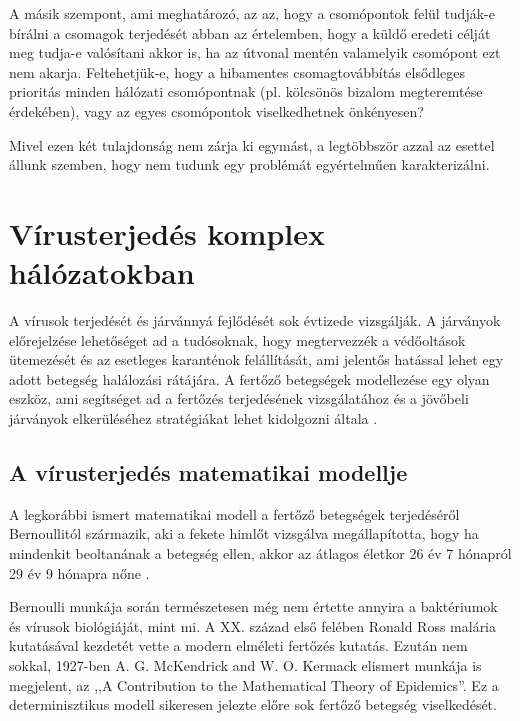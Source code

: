 A másik szempont, ami meghatározó, az az, hogy a csomópontok felül tudják-e bírálni a csomagok terjedését abban az értelemben, hogy a küldő eredeti célját meg tudja-e valósítani akkor is, ha az útvonal mentén valamelyik csomópont ezt nem akarja. Feltehetjük-e, hogy a hibamentes csomagtovábbítás elsődleges prioritás minden hálózati csomópontnak (pl. kölcsönös bizalom megteremtése érdekében), vagy az egyes csomópontok viselkedhetnek önkényesen?

Mivel ezen két tulajdonság nem zárja ki egymást, a legtöbbször azzal az esettel állunk szemben, hogy nem tudunk egy problémát egyértelműen karakterizálni.


  \section{Vírusterjedés komplex hálózatokban}

  A vírusok terjedését és járvánnyá fejlődését sok évtizede vizsgálják. A járványok előrejelzése lehetőséget ad a tudósoknak, hogy megtervezzék a védőoltások ütemezését és az esetleges karanténok felállítását, ami jelentős hatással lehet egy adott betegség halálozási rátájára. A fertőző betegségek modellezése egy olyan eszköz, ami segítséget ad a fertőzés terjedésének vizsgálatához és a jövőbeli járványok elkerüléséhez stratégiákat lehet kidolgozni általa \cite{Epidemic_Modelling_An_Introduction}.

    \subsection{A vírusterjedés matematikai modellje}

    A legkorábbi ismert matematikai modell a fertőző betegségek terjedéséről Bernoullitól származik, aki a fekete himlőt vizsgálva megállapította, hogy ha mindenkit beoltanának a betegség ellen, akkor az átlagos életkor 26 év 7 hónapról 29 év 9 hónapra nőne \cite{Bernoulli_Blower}.

    Bernoulli munkája során természetesen még nem értette annyira a baktériumok és vírusok biológiáját, mint mi. A XX. század első felében Ronald Ross malária kutatásával kezdetét vette a modern elméleti fertőzés kutatás. Ezután nem sokkal, 1927-ben A. G. McKendrick and W. O. Kermack elismert munkája is megjelent, az ,,A Contribution to the Mathematical Theory of Epidemics''. Ez a determinisztikus modell sikeresen jelezte előre sok fertőző betegség viselkedését.\\

